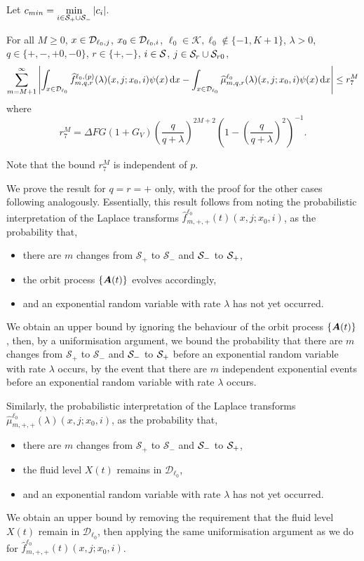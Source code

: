 Let \(c_{min} = \min\limits_{i\in\mathcal S_{+}\cup\mathcal{S}_-} |c_i|\).
\begin{lem}\label{lem: gkjljklgagjklagsjlk}For all \(M\geq 0\), \(x\in\mathcal{D}_{\ell_0,j}\), \(x_0\in\mathcal{D}_{\ell_0,i}\), \(\ell_0\in\mathcal K, \ell_0\notin\{-1,K+1\}\), \(\lambda > 0\), \(q\in\{+,-,+0,-0\}\), \(r\in\{+,-\}\), \(i\in\mathcal{S}\), \(j\in\mathcal{S}_r\cup\mathcal{S}_{r0}\),
	\begin{align}
		\sum_{m=M+1}^\infty \left| \int_{x\in\mathcal{D}_{\ell_0}} \widehat f^{\ell_0,(p)}_{m,q,r}(\lambda)(x,j;x_0,i)\psi(x)\, \mathrm{d} x
		-
		\int_{x\in\mathcal{D}_{\ell_0}} \widehat \mu^{\ell_0}_{m,q,r}(\lambda)(x,j;x_0,i)\psi(x) \, \mathrm{d} x\right| \leq r_7^M
	\end{align}
	where 
	\[r_7^M =  \Delta FG(1+G_V)\left(\frac{q}{q+\lambda}\right)^{2M+2} \left(1-\left(\frac{q}{q+\lambda}\right)^2\right)^{-1} .\]
\end{lem}
Note that the bound \(r_7^M\) is independent of \(p\). 

We prove the result for \(q=r=+\) only, with the proof for the other cases following analogously. Essentially, this result follows from noting the probabilistic interpretation of the Laplace transforms \(\widehat f^{\ell_0}_{m,+,+}(t)(x,j;x_0,i)\), as the probability that, 
\begin{itemize}
	\item there are \(m\) changes from \(\mathcal S_+\) to \(\mathcal S_-\) and \(\mathcal{S}_-\) to \(\mathcal{S}_+\), 
	\item the orbit process \(\{\boldsymbol A(t)\}\) evolves accordingly, 
	\item and an exponential random variable with rate \(\lambda\) has not yet occurred.
\end{itemize}
We obtain an upper bound by ignoring the behaviour of the orbit process \(\{\boldsymbol A(t)\}\), then, by a uniformisation argument, we bound the probability that there are \(m\) changes from \(\mathcal S_+\) to \(\mathcal S_-\) and \(\mathcal{S}_-\) to \(\mathcal{S}_+\) before an exponential random variable with rate \(\lambda\) occurs, by the event that there are \(m\) independent exponential events before an exponential random variable with rate \(\lambda\) occurs.

Similarly, the probabilistic interpretation of the Laplace transforms \(\widehat \mu^{\ell_0}_{m,+,+}(\lambda)(x,j;x_0,i)\), as the probability that, 
\begin{itemize}
	\item there are \(m\) changes from \(\mathcal S_+\) to \(\mathcal S_-\) and \(\mathcal{S}_-\) to \(\mathcal{S}_+\), 
	\item the fluid level \(X(t)\) remains in \(\mathcal D_{\ell_0}\), 
	\item and an exponential random variable with rate \(\lambda\) has not yet occurred.
\end{itemize}
We obtain an upper bound by removing the requirement that the fluid level \(X(t)\) remain in \(\mathcal D_{\ell_0}\), then applying the same uniformisation argument as we do for \(\widehat f^{\ell_0}_{m,+,+}(t)(x,j;x_0,i)\).

